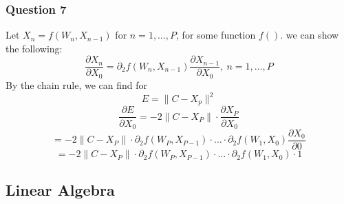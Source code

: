 \documentclass{article}
\begin{document}
\subsubsection*{Question 7}
Let $X_n = f(W_n, X_{n-1})$ for $n = 1, \ldots, P$, for some function $f()$.
\newline
we can show the following:
\begin{equation}
  \frac{\partial{X_n}}{\partial{X_0}} = \partial_2 f(W_n, X_{n-1}) \frac{\partial{X_{n-1}}}{\partial{X_0}},\  n = 1, \ldots, P
\end{equation}
By the chain rule, we can find for 
\begin{equation}
  E = \| C - X_p \|^2
\end{equation}
\begin{equation}
  \frac{\partial E}{\partial X_0} = -2\| C - X_P\| \cdot \frac{\partial{X_P}}{\partial{X_0}}
\end{equation}
\[= -2\|C - X_P\| \cdot \partial_2 f(W_P, X_{P-1}) \cdot \ldots \cdot 
\partial_2 f(W_1, X_{0}) \frac{\partial{X_{0}}}{\partial{0}}\]
\[= -2\|C - X_P\| \cdot \partial_2 f(W_P, X_{P-1}) \cdot \ldots \cdot 
\partial_2 f(W_1, X_{0}) \cdot 1\]



\subsection*{Linear Algebra}
\end{document}
